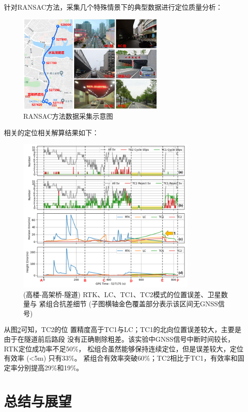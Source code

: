 \documentclass[12pt,hyperref,a4paper,UTF8]{ctexart}
\begin{document}
针对RANSAC方法，采集几个特殊情景下的典型数据进行定位质量分析\cite{Ding_long}\cite{linhuan}：
\begin{figure}[H]
    \centering
    \includegraphics[width=0.65\textwidth]{figures/数据采集.png}
    \caption{RANSAC方法数据采集示意图}
    \label{ransac-data}
\end{figure}
相关的定位相关解算结果如下：
\begin{figure}[H]
    \centering
    \includegraphics[width=0.8\textwidth]{figures/数据采集1.png}
    \caption{(高楼-高架桥-隧道) RTK、LC、TC1、TC2模式的位置误差、卫星数量与
    紧组合抗差细节 (子图横轴金色覆盖部分表示该区间无GNSS信号)  }
    \label{ransac-data1}
\end{figure}

从图\ref{ransac-data1}可知，TC2的位
置精度高于TC1与LC；TC1的北向位置误差较大，主要是由于在隧道前后路段
没有正确剔除粗差。该实验中GNSS信号中断时间较长，RTK定位成功率不足50\%，
松组合虽然能够保持连续定位，但是误差较大，定位有效率 (<5m) 只有33\%。
紧组合有效率突破60\%；TC2相比于TC1，有效率和固定率分别提高29\%和19\%。

\section{总结与展望}
\end{document}
